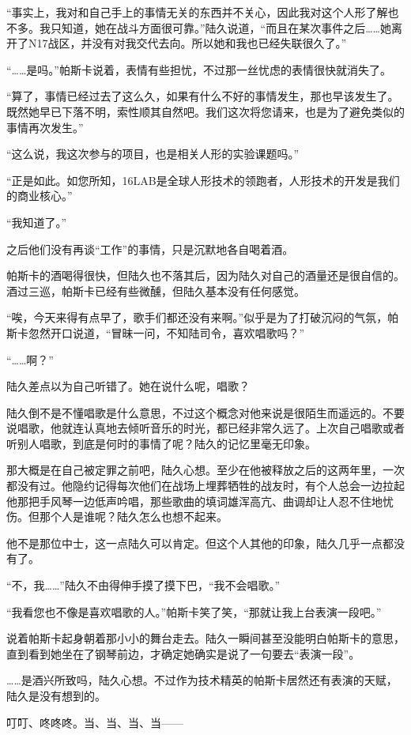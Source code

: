 “事实上，我对和自己手上的事情无关的东西并不关心，因此我对这个人形了解也不多。我只知道，她在战斗方面很可靠。”陆久说道，“而且在某次事件之后……她离开了N17战区，并没有对我交代去向。所以她和我也已经失联很久了。”

“……是吗。”帕斯卡说着，表情有些担忧，不过那一丝忧虑的表情很快就消失了。

“算了，事情已经过去了这么久，如果有什么不好的事情发生，那也早该发生了。既然她早已下落不明，索性顺其自然吧。我们这次将您请来，也是为了避免类似的事情再次发生。”

“这么说，我这次参与的项目，也是相关人形的实验课题吗。”

“正是如此。如您所知，16LAB是全球人形技术的领跑者，人形技术的开发是我们的商业核心。”

“我知道了。”

之后他们没有再谈“工作”的事情，只是沉默地各自喝着酒。

帕斯卡的酒喝得很快，但陆久也不落其后，因为陆久对自己的酒量还是很自信的。酒过三巡，帕斯卡已经有些微醺，但陆久基本没有任何感觉。

“唉，今天来得有点早了，歌手们都还没有来啊。”似乎是为了打破沉闷的气氛，帕斯卡忽然开口说道，“冒昧一问，不知陆司令，喜欢唱歌吗？”

“……啊？”

陆久差点以为自己听错了。她在说什么呢，唱歌？

陆久倒不是不懂唱歌是什么意思，不过这个概念对他来说是很陌生而遥远的。不要说唱歌，他就连认真地去倾听音乐的时光，都已经非常久远了。上次自己唱歌或者听别人唱歌，到底是何时的事情了呢？陆久的记忆里毫无印象。

那大概是在自己被定罪之前吧，陆久心想。至少在他被释放之后的这两年里，一次都没有过。他隐约记得每次他们在战场上埋葬牺牲的战友时，有个人总会一边拉起他那把手风琴一边低声吟唱，那些歌曲的填词雄浑高亢、曲调却让人忍不住地忧伤。但那个人是谁呢？陆久怎么也想不起来。

他不是那位中士，这一点陆久可以肯定。但这个人其他的印象，陆久几乎一点都没有了。

“不，我……”陆久不由得伸手摸了摸下巴，“我不会唱歌。”

“我看您也不像是喜欢唱歌的人。”帕斯卡笑了笑，“那就让我上台表演一段吧。”

说着帕斯卡起身朝着那小小的舞台走去。陆久一瞬间甚至没能明白帕斯卡的意思，直到看到她坐在了钢琴前边，才确定她确实是说了一句要去“表演一段”。

……是酒兴所致吗，陆久心想。不过作为技术精英的帕斯卡居然还有表演的天赋，陆久是没有想到的。

叮叮、咚咚咚。当、当、当、当——

